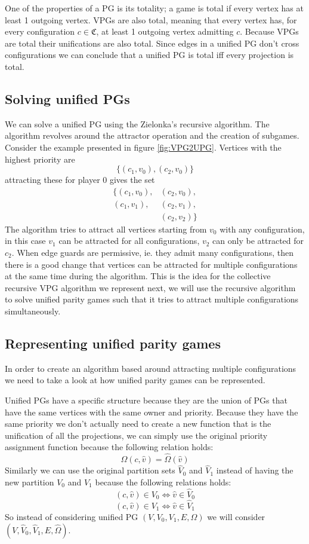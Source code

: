 One of the properties of a PG is its totality; a game is total if every vertex has at least 1 outgoing vertex. VPGs are also total, meaning that every vertex has, for every configuration $c \in \mathfrak{C}$, at least 1 outgoing vertex admitting $c$. Because VPGs are total their unifications are also total. Since edges in a unified PG don't cross configurations we can conclude that a unified PG is total iff every projection is total.

\subsection{Solving unified PGs}
We can solve a unified PG using the Zielonka's recursive algorithm. The algorithm revolves around the attractor operation and the creation of subgames. Consider the example presented in figure \ref{fig:VPG2UPG}. Vertices with the highest priority are 
\[ \{(c_1,v_0),(c_2,v_0)\}\]
attracting these for player $0$ gives the set 
\begin{align*}
\{(c_1,v_0),&(c_2,v_0),\\
(c_1,v_1),&(c_2,v_1),\\
 &(c_2,v_2)\}
\end{align*}
The algorithm tries to attract all vertices starting from $v_0$ with any configuration, in this case $v_1$ can be attracted for all configurations, $v_2$ can only be attracted for $c_2$. When edge guards are permissive, ie. they admit many configurations, then there is a good change that vertices can be attracted for multiple configurations at the same time during the algorithm. This is the idea for the collective recursive VPG algorithm we represent next, we will use the recursive algorithm to solve unified parity games such that it tries to attract multiple configurations simultaneously.

\subsection{Representing unified parity games}
In order to create an algorithm based around attracting multiple configurations we need to take a look at how unified parity games can be represented.


Unified PGs have a specific structure because they are the union of PGs that have the same vertices with the same owner and priority. Because they have the same priority we don't actually need to create a new function that is the unification of all the projections, we can simply use the original priority assignment function because the following relation holds:
\[ \Omega(c,\hat{v}) = \hat{\Omega}(\hat{v}) \]
Similarly we can use the original partition sets $\hat{V}_0$ and $\hat{V}_1$ instead of having the new partition $V_0$ and $V_1$ because the following relations holds:
\[ (c,\hat{v}) \in V_0 \iff \hat{v}\in \hat{V}_0 \]
\[ (c,\hat{v}) \in V_1 \iff \hat{v}\in \hat{V}_1 \]
So instead of considering unified PG $(V,V_0,V_1,E,\Omega)$ we will consider $(V,\hat{V}_0,\hat{V}_1,E,\hat{\Omega})$. 

